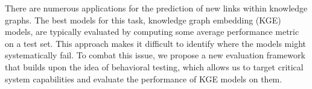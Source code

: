 There are numerous applications for the prediction of new links within knowledge graphs. The best models for this task, knowledge graph embedding (KGE) models, are typically evaluated by computing some average performance metric on a test set. This approach makes it difficult to identify where the models might systematically fail. To combat this issue, we propose a new evaluation framework that builds upon the idea of behavioral testing, which allows us to target critical system capabilities and evaluate the performance of KGE models on them.
